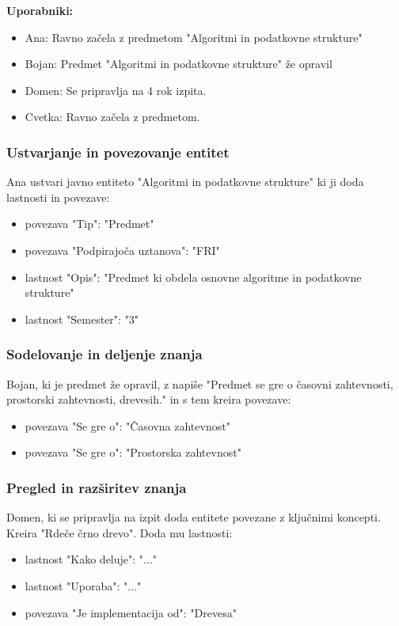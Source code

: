 \documentclass{article}
\begin{document}
\textbf{Uporabniki:}
\begin{itemize}
    \item Ana: Ravno začela z predmetom "Algoritmi in podatkovne strukture"
    \item Bojan: Predmet "Algoritmi in podatkovne strukture" že opravil
    \item Domen: Se pripravlja na 4 rok izpita.
    \item Cvetka: Ravno začela z predmetom.
\end{itemize}

\subsubsection{Ustvarjanje in povezovanje entitet}
Ana ustvari javno entiteto "Algoritmi in podatkovne strukture" ki ji doda lastnosti in povezave:
\begin{itemize}
    \item povezava "Tip": "Predmet"
    \item povezava "Podpirajoča uztanova": "FRI"
    \item lastnost "Opis": "Predmet ki obdela osnovne algoritme in podatkovne strukture"
    \item lastnost "Semester": "3"
\end{itemize}

\subsubsection{Sodelovanje in deljenje znanja}
Bojan, ki je predmet že opravil, z napiše "Predmet se gre o časovni zahtevnosti, prostorski zahtevnosti, drevesih." in s tem kreira povezave:
\begin{itemize}
    \item povezava "Se gre o": "Časovna zahtevnost"
    \item povezava "Se gre o": "Prostorska zahtevnost"
\end{itemize}

\subsubsection{Pregled in razširitev znanja}
Domen, ki se pripravlja na izpit doda entitete povezane z ključnimi koncepti. Kreira "Rdeče črno drevo". Doda mu lastnosti:
\begin{itemize}
    \item lastnost "Kako deluje": "..."
    \item lastnost "Uporaba": "..."
    \item povezava "Je implementacija od": "Drevesa"
\end{itemize}
\end{document}
